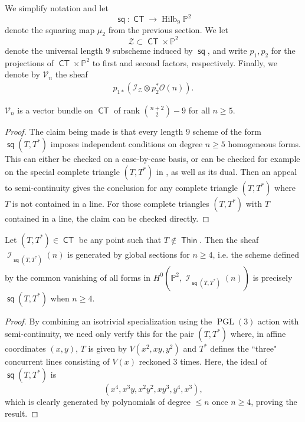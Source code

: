 \documentclass{article}
\renewcommand{\P}{\mathbb{P}}
\DeclareMathOperator{\PGL}{PGL}
\DeclareMathOperator{\Hilb}{Hilb}
\DeclareMathOperator{\I}{\mathcal{I}}
\renewcommand{\O}{\mathcal{O}}
\DeclareMathOperator{\CT}{\mathsf{CT}}
\DeclareMathOperator{\Thin}{\mathsf{Thin}}
\DeclareMathOperator{\s}{\mathsf{sq}}
\begin{document}
We simplify notation and let
\[\s : \CT \to \Hilb_{9}\P^{2} \] denote the squaring map
$\mu_{2}$ from the previous section.  We let
\[\mathcal{Z} \subset \CT \times \P^{2}\] denote the universal length
$9$ subscheme induced by $\s$, and write $p_1, p_2$ for the projections of
$\CT \times \P^{2}$ to first and second factors, respectively.  Finally, we denote by $\mathcal{V}_{n}$ the sheaf 
\begin{align}
\label{Vn}
p_{1*}\left(\mathcal{I}_{\mathcal{Z}} \otimes p_{2}^{*}\O(n) \right).
\end{align}
\begin{proposition}
  \label{proposition:vectorbundle}
  $\mathcal{V}_{n}$  is
  a vector bundle on $\CT$ of rank ${n+2 \choose 2} - 9$ for all $n \geq 5$.
\end{proposition}

\begin{proof}
  The claim being made is that every length $9$ scheme of the form  $\s(T,T^{*})$
  imposes independent conditions on degree $n \geq 5$ homogeneous
  forms. This can either be
  checked on a case-by-case basis, or can be checked for example on
  the special complete triangle $(T,T^{*})$ in
  , as well as its dual. Then an appeal to semi-continuity gives
  the conclusion for any complete triangle $(T,T^{*})$ where $T$ is
  not contained in a line.  For those complete triangles $(T,T^{*})$
  with $T$ contained in a line, the claim can be checked directly.
\end{proof}

\begin{lemma}
    \label{lemma:generatedquintics} Let  $(T,T^{*}) \in \CT$ be any point such that $T \notin \Thin$. Then the sheaf $\I_{\s(T,T^{*})}(n)$ is generated by global sections for $n \geq 4$, i.e. the scheme defined by the common vanishing of all forms in $H^{0}(\P^{2},\I_{\s(T,T^{*})}(n))$ is precisely $\s(T,T^{*})$ when $n \geq 4$.
\end{lemma}

\begin{proof}
    By combining an isotrivial specialization using the $\PGL(3)$ action with semi-continuity, we need only verify this for the pair $(T,T^{*})$ where, in affine coordinates $(x,y)$, $T$ is given by $V(x^2,xy,y^2)$ and $T^{*}$ defines the ``three" concurrent lines consisting of $V(x)$  reckoned 3 times.  Here, the ideal of $\s(T,T^{*})$ is \[(x^{4},x^{3}y,x^{2}y^{2},xy^{3},y^{4},x^3),\] which is clearly generated by polynomials of degree $\leq n$ once $n \geq 4$, proving the result.
\end{proof} 
\end{document}
